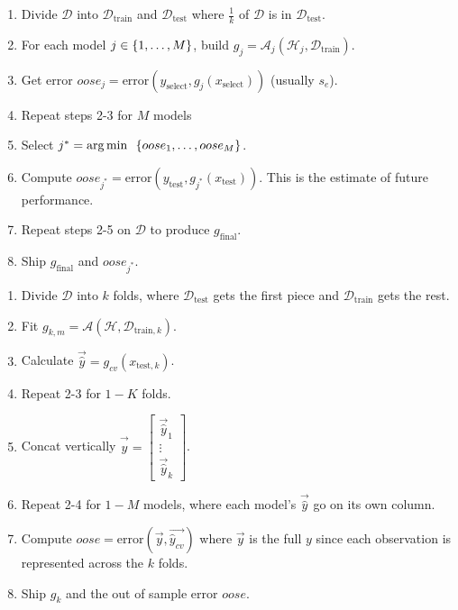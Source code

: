 \documentclass[12pt]{article}
\begin{document}
\begin{enumerate}
\begin{enumerate}
\item Divide $\mathcal{D}$ into $\mathcal{D}_{\text{train}}$ and $\mathcal{D}_{\text{test}}$ where $\frac{1}{k}$ of $\mathcal{D}$ is in $\mathcal{D}_{\text{test}}$. 
 \item For each model $j \in \left\{1,\dots,M\right\}$, build $g_j = \mathcal{A}_j(\mathcal{H}_j, \mathcal{D}_{\text{train}})$. 
 \item Get error $oose_j = \text{error}(y_{\text{select}}, g_j(x_{\text{select}}))$ (usually $s_e$). 
 \item Repeat steps 2-3 for $M$ models
 \item Select $j^* = \operatorname*{arg\,min~}{} \left\{oose_1, \dots, oose_M\right\}$. 
 \item Compute $oose_{j^*} = \text{error}(y_{\text{test}}, g_{j^*}(x_{\text{test}}))$. This is the estimate of future performance. 
 \item Repeat steps 2-5 on $\mathcal{D}$ to produce $g_{\text{final}}$. 
 \item Ship $g_{\text{final}}$ and $oose_{j^*}$. 
 \end{enumerate} 


\begin{enumerate} 
\item Divide $\mathcal{D}$ into $k$ folds, where $\mathcal{D}_{\text{test}}$ gets the first piece and $\mathcal{D}_{\text{train}}$ gets the rest.
\item Fit $g_{k,m} = \mathcal{A}(\mathcal{H}, \mathcal{D}_{\text{train}, k})$.
\item Calculate $\vec{\hat{y}} = g_{cv}(x_{\text{test}, k})$. 
\item Repeat 2-3 for $1-K$ folds.
\item Concat vertically $\vec{\hat{y}} = \begin{bmatrix} \vec{\hat{y}}_1 \\ \vdots \\ \vec{\hat{y}}_k \end{bmatrix} $.
\item Repeat 2-4 for $1-M$ models, where each model's $\vec{\hat{y}}$ go on its own column. 
\item Compute $oose = \text{error}(\vec{y}, \vec{\hat{y}_{cv}})$ where $\vec{y}$ is the full $y$ since each observation is represented across the $k$ folds.
\item Ship $g_k$ and the out of sample error $oose$. \end{enumerate} 

\end{enumerate}
\end{document}
